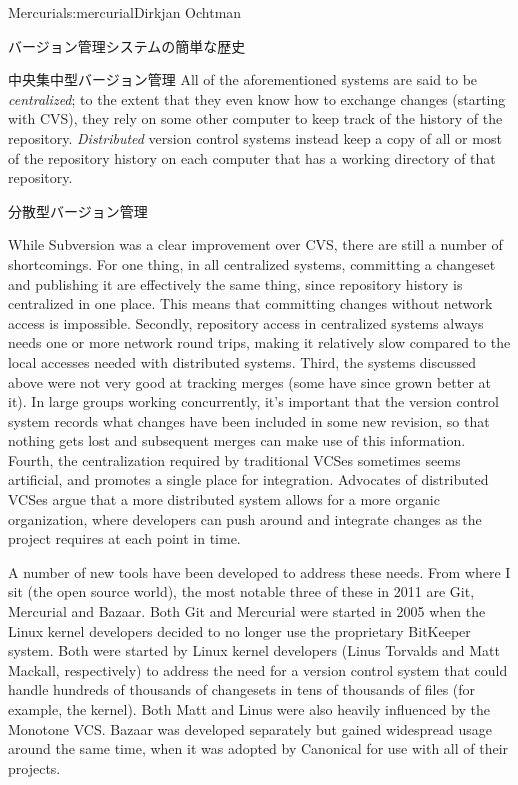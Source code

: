 \begin{aosachapter}{Mercurial}{s:mercurial}{Dirkjan Ochtman}
\begin{aosasect1}{バージョン管理システムの簡単な歴史}
\begin{aosasect2}{中央集中型バージョン管理}
All of the aforementioned systems are said to be \emph{centralized};
to the extent that they even know how to exchange changes (starting
with CVS), they rely on some other computer to keep track of the
history of the repository. \emph{Distributed} version control systems
instead keep a copy of all or most of the repository history on each
computer that has a working directory of that repository.

\end{aosasect2}

\begin{aosasect2}{分散型バージョン管理}

While Subversion was a clear improvement over CVS, there are still a
number of shortcomings. For one thing, in all centralized systems,
committing a changeset and publishing it are effectively the same
thing, since repository history is centralized in one place. This
means that committing changes without network access is
impossible. Secondly, repository access in centralized systems always
needs one or more network round trips, making it relatively slow compared
to the local accesses needed with distributed systems. Third, the systems
discussed above were not very good at tracking merges (some have since
grown better at it). In large groups working concurrently, it's
important that the version control system records what changes have
been included in some new revision, so that nothing gets lost and
subsequent merges can make use of this information. Fourth, the
centralization required by traditional VCSes sometimes seems
artificial, and promotes a single place for integration. Advocates of
distributed VCSes argue that a more distributed system allows for a
more organic organization, where developers can push around and
integrate changes as the project requires at each point in time.

A number of new tools have been developed to address these needs. From
where I sit (the open source world), the most notable three of these
in 2011 are Git, Mercurial and Bazaar. Both Git and Mercurial were
started in 2005 when the Linux kernel developers decided to no longer
use the proprietary BitKeeper system. Both were started by Linux
kernel developers (Linus Torvalds and Matt Mackall, respectively) to
address the need for a version control system that could handle
hundreds of thousands of changesets in tens of thousands of files (for
example, the kernel). Both Matt and Linus were also heavily influenced
by the Monotone VCS\@. Bazaar was developed separately but gained
widespread usage around the same time, when it was adopted by
Canonical for use with all of their projects.


\end{aosasect2}
\end{aosasect1}
\end{aosachapter}
